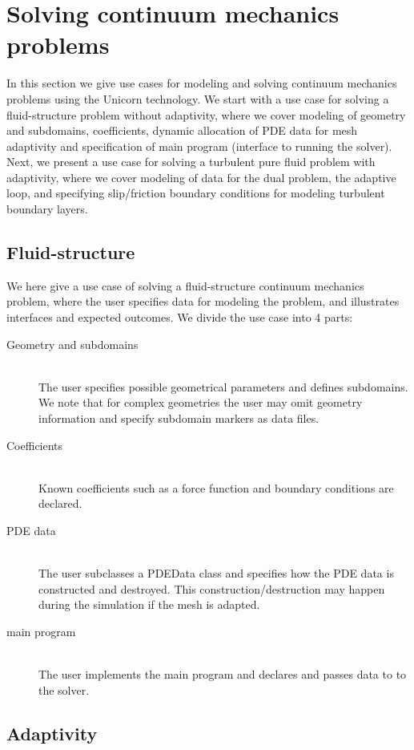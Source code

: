 \section{Solving continuum mechanics problems}

In this section we give use cases for modeling and solving continuum
mechanics problems using the Unicorn technology. We start with a use
case for solving a fluid-structure problem without adaptivity, where
we cover modeling of geometry and subdomains, coefficients, dynamic
allocation of PDE data for mesh adaptivity and specification of main
program (interface to running the solver). Next, we present a use case
for solving a turbulent pure fluid problem with adaptivity, where we
cover modeling of data for the dual problem, the adaptive loop, and
specifying slip/friction boundary conditions for modeling turbulent
boundary layers.


\subsection{Fluid-structure}

We here give a use case of solving a fluid-structure continuum
mechanics problem, where the user specifies data for modeling the
problem, and illustrates interfaces and expected outcomes. We divide
the use case into 4 parts:

\begin{description}
\item[Geometry and subdomains]
\ \\
The user specifies possible geometrical parameters and defines
subdomains. We note that for complex geometries the user may omit
geometry information and specify subdomain markers as data files.
\item[Coefficients]
\ \\
Known coefficients such as a force function and boundary conditions
are declared.
\item[PDE data]
\ \\
The user subclasses a PDEData class and specifies how the PDE data is
constructed and destroyed. This construction/destruction may happen
during the simulation if the mesh is adapted.
\item[main program]
\ \\
The user implements the main program and declares and passes data to
to the solver.
\end{description}

\subsection{Adaptivity}

